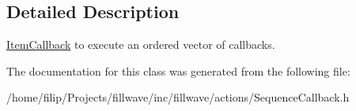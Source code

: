 \subsection{Detailed Description}
\hyperlink{classfillwave_1_1actions_1_1ItemCallback}{Item\+Callback} to execute an ordered vector of callbacks. 

The documentation for this class was generated from the following file\+:\begin{DoxyCompactItemize}
\item 
/home/filip/\+Projects/fillwave/inc/fillwave/actions/Sequence\+Callback.\+h\end{DoxyCompactItemize}
